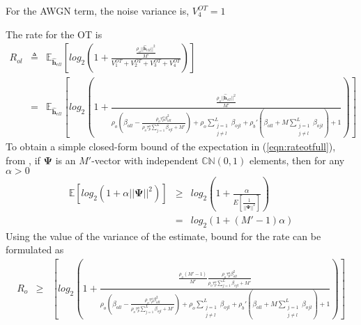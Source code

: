 \documentclass[10pt, a4paper, twoside,fleqn]{article}
\begin{document}
For the AWGN term, the noise variance is, $V_4^{OT} = 1$

The rate for the OT is
\begin{eqnarray}\label{eqn:rateotfull}
	R_{ol} &\triangleq& \mathbb{E}_{\pmb{\hat h}_{ell}}\left[log_2\left(1+\frac{\frac{\rho_o||\pmb{\hat h}_{ell}||^2}{M'}}{V_1^{OT}+V_2^{OT}+V_3^{OT}+V_4^{OT}}\right) \right] \nonumber \\
            &=&  \mathbb{E}_{\pmb{\hat h}_{ell}}\left[log_2\left(1+\frac{\frac{\rho_o||\pmb{\hat h}_{ell}||^2}{M'}}
								 {\rho_o\left(\beta_{oll}-\frac{\rho_o\tau_p^o\beta^2_{oll}}{\rho_o\tau_p^o\sum\limits_{j=1}^{L}\beta_{ojl}+M'}\right)        
								  + \rho_o \sum\limits_{\substack{j=1 \\ j\neq l}}^{L} \beta_{ojl} 
								  +\rho_b' \left(\beta_{oll}+ M \sum\limits_{\substack{j=1 \\ j\neq l}}^{L}\beta_{ojl}\right)
								  +1}\right) \right]	
\end{eqnarray}
To obtain a simple closed-form bound of the expectation in (\ref{eqn:rateotfull}), from \cite{bib:dtsysBook}, if $\pmb{\Psi}$ is an $M'$-vector with independent ${\mathbb C}{\mathbb N}(0,1)$ elements, then for any $\alpha>0$
\begin{eqnarray}\label{eqn:bound}
	\mathbb{E}[log_2(1+\alpha||\pmb{\Psi}||^2)] &\geq& log_2\left(1+\frac{\alpha}{E[\frac{1}{||\pmb{\Psi}||^2}]}\right) \nonumber \\
                                              &=&  log_2(1+(M'-1)\alpha)
\end{eqnarray}
Using the value of the variance of the estimate, bound for the rate can be formulated as
\begin{eqnarray}
	R_o &\geq& \left[log_2\left(1+\frac{\frac{\rho_o(M'-1)}{M'}\frac{\rho_o\tau_p^o\beta^2_{oll}}{\rho_o\tau_p^o\sum\limits_{j=1}^{L}\beta_{ojl}+M'}}
								 {\rho_o\left(\beta_{oll}-\frac{\rho_o\tau_p^o\beta^2_{oll}}{\rho_o\tau_p^o\sum\limits_{j=1}^{L}\beta_{ojl}+M'}\right)        
                                     + \rho_o \sum\limits_{\substack{j=1 \\ j\neq l}}^{L} \beta_{ojl} 
                                     +\rho_b' \left(\beta_{oll}+ M \sum\limits_{\substack{j=1 \\ j\neq l}}^{L}\beta_{ojl}\right)
                                     +1}\right) \right]	
\end{eqnarray}
{}

\enddocument
\end{document}
